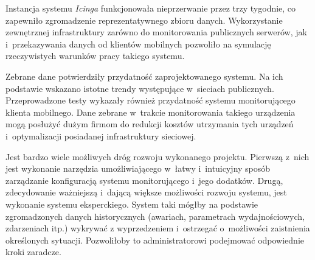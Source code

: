 Instancja systemu {\em Icinga} funkcjonowała nieprzerwanie przez trzy
tygodnie, co zapewniło zgromadzenie reprezentatywnego zbioru
danych. Wykorzystanie zewnętrznej infrastruktury zarówno do
monitorowania publicznych serwerów, jak i~przekazywania danych od
klientów mobilnych pozwoliło na symulację rzeczywistych warunków pracy
takiego systemu.

Zebrane dane potwierdziły przydatność zaprojektowanego systemu. Na ich
podstawie wskazano istotne trendy występujące w~sieciach
publicznych. Przeprowadzone testy wykazały również przydatność systemu
monitorującego klienta mobilnego. Dane zebrane w~trakcie monitorowania
takiego urządzenia mogą posłużyć dużym firmom do redukcji kosztów
utrzymania tych urządzeń i~optymalizacji posiadanej infrastruktury
sieciowej.

Jest bardzo wiele możliwych dróg rozwoju wykonanego projektu. Pierwszą
z~nich jest wykonanie narzędzia umożliwiającego w~łatwy i~intuicyjny
sposób zarządzanie konfiguracją systemu monitorującego i~jego
dodatków. Drugą, zdecydowanie ważniejszą i~dającą większe możliwości
rozwoju systemu, jest wykonanie systemu eksperckiego. System taki
mógłby na podstawie zgromadzonych danych historycznych (awariach,
parametrach wydajnościowych, zdarzeniach itp.) wykrywać z
wyprzedzeniem i~ostrzegać o~możliwości zaistnienia określonych
sytuacji. Pozwoliłoby to administratorowi podejmować odpowiednie kroki
zaradcze.
